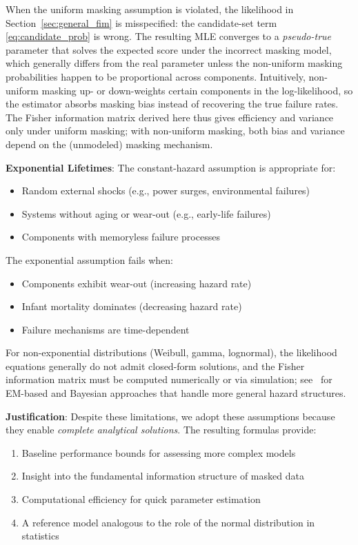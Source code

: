 \documentclass[12pt]{article}
\theoremstyle{definition}
\theoremstyle{remark}
\begin{document}
When the uniform masking assumption is violated, the likelihood in Section~\ref{sec:general_fim} is misspecified: the candidate-set term \eqref{eq:candidate_prob} is wrong. The resulting MLE converges to a \emph{pseudo-true} parameter that solves the expected score under the incorrect masking model, which generally differs from the real parameter unless the non-uniform masking probabilities happen to be proportional across components. Intuitively, non-uniform masking up- or down-weights certain components in the log-likelihood, so the estimator absorbs masking bias instead of recovering the true failure rates. The Fisher information matrix derived here thus gives efficiency and variance only under uniform masking; with non-uniform masking, both bias and variance depend on the (unmodeled) masking mechanism.

\textbf{Exponential Lifetimes}: The constant-hazard assumption is appropriate for:
\begin{itemize}
\item Random external shocks (e.g., power surges, environmental failures)
\item Systems without aging or wear-out (e.g., early-life failures)
\item Components with memoryless failure processes
\end{itemize}

The exponential assumption fails when:
\begin{itemize}
\item Components exhibit wear-out (increasing hazard rate)
\item Infant mortality dominates (decreasing hazard rate)
\item Failure mechanisms are time-dependent
\end{itemize}

For non-exponential distributions (Weibull, gamma, lognormal), the likelihood equations generally do not admit closed-form solutions, and the Fisher information matrix must be computed numerically or via simulation; see~\cite{craiu2004,liu2021} for EM-based and Bayesian approaches that handle more general hazard structures.

\textbf{Justification}: Despite these limitations, we adopt these assumptions because they enable \emph{complete analytical solutions}. The resulting formulas provide:
\begin{enumerate}
\item Baseline performance bounds for assessing more complex models
\item Insight into the fundamental information structure of masked data
\item Computational efficiency for quick parameter estimation
\item A reference model analogous to the role of the normal distribution in statistics
\end{enumerate}
\end{document}
